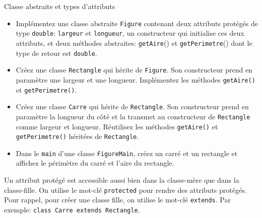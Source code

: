 	
	\begin{Exercice}[15 minutes]{Classe abstraite et types d'attributs}
	\begin{itemize}
		\item Implémentez une classe abstraite \lstinline{Figure} contenant deux attributs protégés de type \lstinline{double}: \lstinline{largeur} et \lstinline{longueur}, un constructeur qui initialise ces deux attributs, et deux méthodes abstraites: \lstinline{getAire}() et \lstinline{getPerimetre}() dont le type de retour est \lstinline{double}.
		
		\item Créez une classe \lstinline{Rectangle} qui hérite de \lstinline{Figure}. Son constructeur prend en paramètre une largeur et une longueur. Implémentez les méthodes \lstinline{getAire()} et \lstinline{getPerimetre()}.

		\item Créez une classe \lstinline{Carre} qui hérite de \lstinline{Rectangle}. Son constructeur prend en paramètre la longueur du côté et la transmet au constructeur de \lstinline{Rectangle} comme largeur et longueur. Réutilisez les méthodes \lstinline{getAire()} et \lstinline{getPerimetre()} héritées de \lstinline{Rectangle}.
		
		\item Dans le \lstinline{main} d'une classe \lstinline{FigureMain}, créez un carré et un rectangle et affichez le périmètre du carré et l'aire du rectangle.
	\end{itemize}
	
	\begin{conseil}
		Un attribut protégé est accessible aussi bien dans la classe-mère que dans la classe-fille. On utilise le mot-clé \lstinline{protected} pour rendre des attributs protégés. \\
		Pour rappel, pour créer une classe fille, on utilise le mot-clé \lstinline{extends}. Par exemple: \lstinline{class Carre extends Rectangle}.
	\end{conseil}

	\begin{solution}
		 
	\end{solution}
	\begin{solution}
		
	\end{solution}
	\begin{solution}
		
	\end{solution} 
	\begin{solution}
		 
	\end{solution}
	\end{Exercice}

